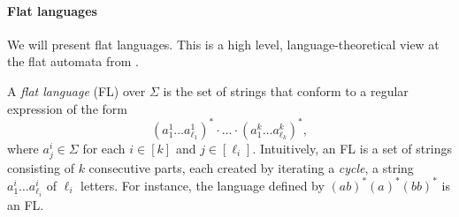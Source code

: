 





\paragraph{Flat languages}


We will present flat languages. This is a high level, language-theoretical view at the flat automata from \cite{Parosh:20:PLDI}. 

A \emph{flat language} (FL)  over $\Sigma$
is the set of strings 
that conform to a regular expression of the form
$$
(a^1_1\ldots a^1_{\ell_1})^* \cdot \ldots \cdot (a^k_1\ldots a^k_{\ell_k})^*, 
$$
where $a^i_j \in \Sigma$ for each $i \in [k]$ and $j \in [\ell_i]$.
Intuitively, an FL is a set of strings consisting of $k$ consecutive parts, each created by iterating a \emph{cycle}, a string $a^i_1\ldots a^i_{\ell_i}$ of $\ell_i$ letters. 
For instance, the language defined by $(ab)^*(a)^*(bb)^*$ is an FL.




